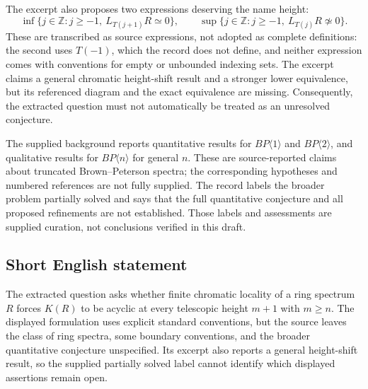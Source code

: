 \documentclass[11pt]{article}
\newcommand{\Z}{\mathbb{Z}}
\begin{document}
The excerpt also proposes two expressions deserving the name height:
\[
\inf\{j\in\Z:j\geq -1,\ L_{T(j+1)}R\simeq 0\},
\qquad
\sup\{j\in\Z:j\geq -1,\ L_{T(j)}R\not\simeq 0\}.
\]
These are transcribed as source expressions, not adopted as complete definitions: the second uses \(T(-1)\), which the record does not define, and neither expression comes with conventions for empty or unbounded indexing sets. The excerpt claims a general chromatic height-shift result and a stronger lower equivalence, but its referenced diagram and the exact equivalence are missing. Consequently, the extracted question must not automatically be treated as an unresolved conjecture.

The supplied background reports quantitative results for \(BP\langle 1\rangle\) and \(BP\langle 2\rangle\), and qualitative results for \(BP\langle n\rangle\) for general \(n\). These are source-reported claims about truncated Brown--Peterson spectra; the corresponding hypotheses and numbered references are not fully supplied. The record labels the broader problem partially solved and says that the full quantitative conjecture and all proposed refinements are not established. Those labels and assessments are supplied curation, not conclusions verified in this draft.
\subsection{Short English statement}
The extracted question asks whether finite chromatic locality of a ring spectrum \(R\) forces \(K(R)\) to be acyclic at every telescopic height \(m+1\) with \(m\geq n\). The displayed formulation uses explicit standard conventions, but the source leaves the class of ring spectra, some boundary conventions, and the broader quantitative conjecture unspecified. Its excerpt also reports a general height-shift result, so the supplied partially solved label cannot identify which displayed assertions remain open.
\end{document}
